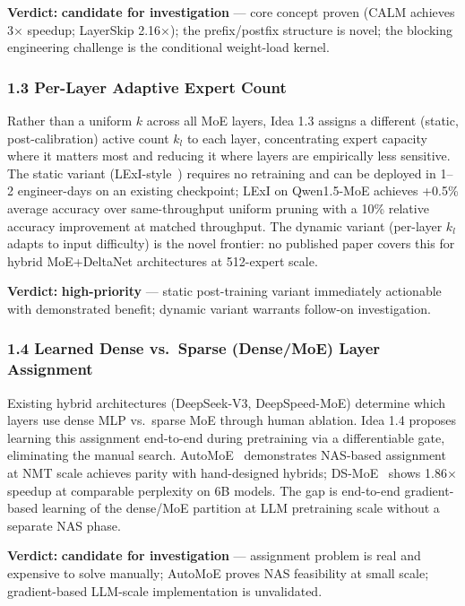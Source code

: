 \documentclass[11pt]{article}
\begin{document}
\textbf{Verdict:} \textbf{candidate for investigation} --- core concept proven (CALM achieves 3$\times$ speedup; LayerSkip 2.16$\times$); the prefix/postfix structure is novel; the blocking engineering challenge is the conditional weight-load kernel.

\subsubsection{1.3 Per-Layer Adaptive Expert Count}
\label{sec:idea_1_3}

Rather than a uniform $k$ across all MoE layers, Idea 1.3 assigns a different (static, post-calibration) active count $k_l$ to each layer, concentrating expert capacity where it matters most and reducing it where layers are empirically less sensitive.
The static variant (LExI-style~\cite{ChittyVenkata2025LExI}) requires no retraining and can be deployed in 1--2 engineer-days on an existing checkpoint; LExI on Qwen1.5-MoE achieves +0.5\% average accuracy over same-throughput uniform pruning with a 10\% relative accuracy improvement at matched throughput.
The dynamic variant (per-layer $k_l$ adapts to input difficulty) is the novel frontier: no published paper covers this for hybrid MoE+DeltaNet architectures at 512-expert scale.

\textbf{Verdict:} \textbf{high-priority} --- static post-training variant immediately actionable with demonstrated benefit; dynamic variant warrants follow-on investigation.

\subsubsection{1.4 Learned Dense vs.\ Sparse (Dense/MoE) Layer Assignment}
\label{sec:idea_1_4}

Existing hybrid architectures (DeepSeek-V3, DeepSpeed-MoE) determine which layers use dense MLP vs.\ sparse MoE through human ablation.
Idea 1.4 proposes learning this assignment end-to-end during pretraining via a differentiable gate, eliminating the manual search.
AutoMoE~\cite{Jawahar2022AutoMoE} demonstrates NAS-based assignment at NMT scale achieves parity with hand-designed hybrids; DS-MoE~\cite{Yuan2024DSMoE} shows 1.86$\times$ speedup at comparable perplexity on 6B models.
The gap is end-to-end gradient-based learning of the dense/MoE partition at LLM pretraining scale without a separate NAS phase.

\textbf{Verdict:} \textbf{candidate for investigation} --- assignment problem is real and expensive to solve manually; AutoMoE proves NAS feasibility at small scale; gradient-based LLM-scale implementation is unvalidated.
\end{document}
